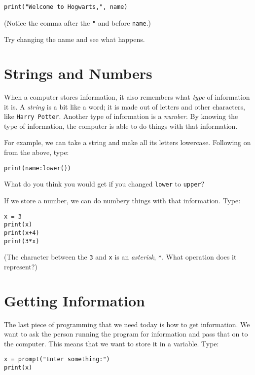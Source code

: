 \documentclass[
  xhtml,%
  text
]{internet}
\begin{document}
\begin{verbatim}
print("Welcome to Hogwarts,", name)
\end{verbatim}

(Notice the comma after the \verb+"+ and before \verb+name+.)

Try changing the name and see what happens.

\section*{Strings and Numbers}

When a computer stores information, it also remembers what \emph{type} of information it is. 
A \emph{string} is a bit like a word; it is made out of letters and other characters, like \verb+Harry Potter+.
Another type of information is a \emph{number}.
By knowing the type of information, the computer is able to do things with that information.

For example, we can take a string and make all its letters lowercase.
Following on from the above, type:

\begin{verbatim}
print(name:lower())
\end{verbatim}

What do you think you would get if you changed \verb+lower+ to \verb+upper+?

\bigskip

If we store a number, we can do numbery things with that information.
Type:

\begin{verbatim}
x = 3
print(x)
print(x+4)
print(3*x)
\end{verbatim}

(The character between the \verb+3+ and \verb+x+ is an \emph{asterisk}, \verb+*+.
What operation does it represent?)

\section*{Getting Information}

The last piece of programming that we need today is how to get information.
We want to ask the person running the program for information and pass that on to the computer.
This means that we want to store it in a variable.
Type:

\begin{verbatim}
x = prompt("Enter something:")
print(x)
\end{verbatim}
\end{document}
